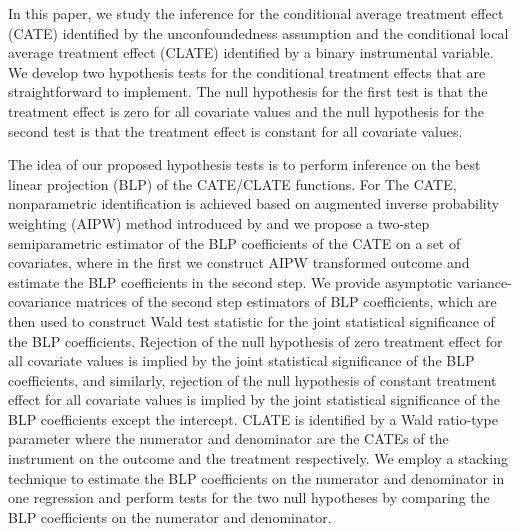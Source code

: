 \documentclass[
  12pt,
  12pt]{article}
\numberwithin{equation}{section}
\theoremstyle{definition}
\theoremstyle{plain}
\theoremstyle{plain}
\theoremstyle{remark}
\begin{document}
In this paper, we study the inference for the conditional average
treatment effect (CATE) identified by the unconfoundedness assumption
and the conditional local average treatment effect (CLATE) identified by
a binary instrumental variable. We develop two hypothesis tests for the
conditional treatment effects that are straightforward to implement. The
null hypothesis for the first test is that the treatment effect is zero
for all covariate values and the null hypothesis for the second test is
that the treatment effect is constant for all covariate values.

The idea of our proposed hypothesis tests is to perform inference on the
best linear projection (BLP) of the CATE/CLATE functions. For The CATE,
nonparametric identification is achieved based on augmented inverse
probability weighting (AIPW) method introduced by
\citet{robins1994estimation} and we propose a two-step semiparametric
estimator of the BLP coefficients of the CATE on a set of covariates,
where in the first we construct AIPW transformed outcome and estimate
the BLP coefficients in the second step. We provide asymptotic
variance-covariance matrices of the second step estimators of BLP
coefficients, which are then used to construct Wald test statistic for
the joint statistical significance of the BLP coefficients. Rejection of
the null hypothesis of zero treatment effect for all covariate values is
implied by the joint statistical significance of the BLP coefficients,
and similarly, rejection of the null hypothesis of constant treatment
effect for all covariate values is implied by the joint statistical
significance of the BLP coefficients except the intercept. CLATE is
identified by a Wald ratio-type parameter where the numerator and
denominator are the CATEs of the instrument on the outcome and the
treatment respectively. We employ a stacking technique to estimate the
BLP coefficients on the numerator and denominator in one regression and
perform tests for the two null hypotheses by comparing the BLP
coefficients on the numerator and denominator.
\end{document}

